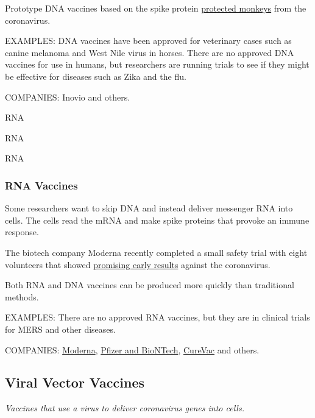 Prototype DNA vaccines based on the spike protein
\href{https://www.nytimes3xbfgragh.onion/2020/05/20/health/coronavirus-vaccine-harvard.html}{protected
monkeys} from the coronavirus.

EXAMPLES: DNA vaccines have been approved for veterinary cases such as
canine melanoma and West Nile virus in horses. There are no approved DNA
vaccines for use in humans, but researchers are running trials to see if
they might be effective for diseases such as Zika and the flu.

COMPANIES: Inovio and others.

RNA

RNA

RNA

\hypertarget{rna-vaccines}{%
\subsubsection{\texorpdfstring{\textbf{RNA
Vaccines}}{RNA Vaccines}}\label{rna-vaccines}}

Some researchers want to skip DNA and instead deliver messenger RNA into
cells. The cells read the mRNA and make spike proteins that provoke an
immune response.

The biotech company Moderna recently completed a small safety trial with
eight volunteers that showed
\href{https://www.nytimes3xbfgragh.onion/2020/05/18/health/coronavirus-vaccine-moderna.html}{promising
early results} against the coronavirus.

Both RNA and DNA vaccines can be produced more quickly than traditional
methods.

EXAMPLES: There are no approved RNA vaccines, but they are in clinical
trials for MERS and other diseases.

COMPANIES:
\href{https://www.nytimes3xbfgragh.onion/2020/05/18/health/coronavirus-vaccine-moderna.html}{Moderna},
\href{https://www.nytimes3xbfgragh.onion/2020/05/05/health/pfizer-vaccine-coronavirus.html}{Pfizer
and BioNTech},
\href{https://www.nytimes3xbfgragh.onion/reuters/2020/05/14/world/europe/14reuters-health-coronavirus-curevac.html}{CureVac}
and others.

\hypertarget{viral-vector-vaccines}{%
\subsection{\texorpdfstring{\textbf{Viral Vector
Vaccines}}{Viral Vector Vaccines}}\label{viral-vector-vaccines}}

\emph{Vaccines that use a virus to deliver coronavirus genes into
cells.}

